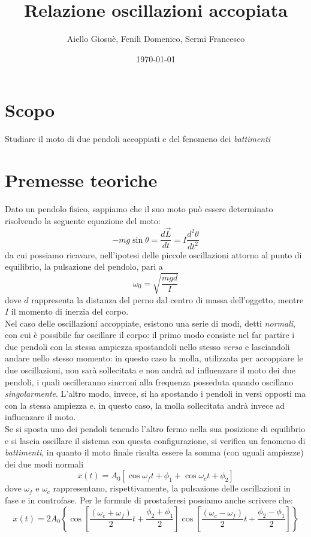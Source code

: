 \documentclass{article}
\title{Relazione oscillazioni accopiata}
\author{Aiello Giosuè, Fenili Domenico, Sermi Francesco}
\date{\today}
\begin{document}
\maketitle
\newpage
\tableofcontents

\newpage
\section{Scopo}
Studiare il moto di due pendoli accoppiati e del fenomeno dei \emph{battimenti}
\section{Premesse teoriche}
Dato un pendolo fisico, sappiamo che il suo moto può essere determinato risolvendo la seguente equazione del moto:
\begin{equation}
	-mg\sin{\theta} = \frac{d\vec{L}}{dt} = I\frac{d^2 \theta}{dt^2}
\end{equation}
da cui possiamo ricavare, nell'ipotesi delle piccole oscillazioni attorno al punto di equilibrio, la pulsazione del pendolo, pari a
\begin{equation}
	\omega_0 = \sqrt{\frac{mgd}{I}}
\end{equation}
dove $d$ rappresenta la distanza del perno dal centro di massa dell'oggetto, mentre $I$ il momento di inerzia del corpo. \\
Nel caso delle oscillazioni accoppiate, esistono una serie di modi, detti \emph{normali}, con cui è possibile far oscillare il corpo: il primo modo consiste nel far partire i due pendoli con la stessa ampiezza spostandoli nello stesso \emph{verso} e lasciandoli andare nello stesso momento: in questo caso la molla, utilizzata per accoppiare le due oscillazioni, non sarà sollecitata e non andrà ad influenzare il moto dei due pendoli, i quali oscilleranno sincroni alla frequenza posseduta quando oscillano \emph{singolarmente}. L'altro modo, invece, si ha spostando i pendoli in versi opposti ma con la stessa ampiezza e, in questo caso, la molla sollecitata andrà invece ad influenzare il moto. \\
Se si sposta uno dei pendoli tenendo l'altro fermo nella sua posizione di equilibrio e si lascia oscillare il sistema con questa configurazione, si verifica un fenomeno di \emph{battimenti}, in quanto il moto finale risulta essere la somma (con uguali ampiezze) dei due modi normali
\begin{equation}
	x(t) = A_0 \left[\cos{\omega_f t + \phi_1} + \cos{\omega_c t + \phi_2} \right]
\end{equation}
dove $\omega_f$ e $\omega_c$ rappresentano, rispettivamente, la pulsazione delle oscillazioni in fase e in controfase. Per le formule di prostaferesi possiamo anche scrivere che:
\begin{equation}
	x(t) = 2A_0 \left\{ \cos{\left[\frac{(\omega_c + \omega_f)}{2} t + \frac{\phi_2 + \phi_1}{2} \right] } \cos{\left[ \frac{(\omega_c - \omega_f)}{2} t + \frac{\phi_2 - \phi_1}{2} \right]} \right\}
\end{equation}
\end{document}
